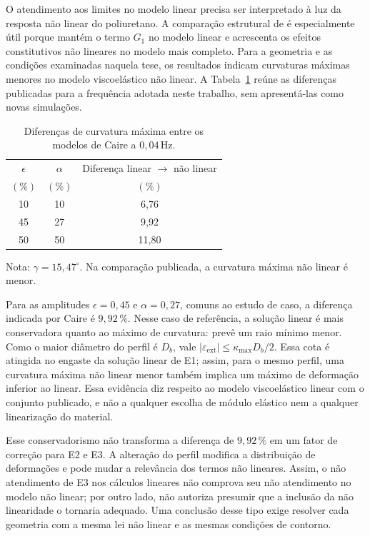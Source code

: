 \documentclass[arial,centeredequations,english,brazilian,oneside,section=TITLE]{ifes8}
\begin{document}
O atendimento aos limites no modelo linear precisa ser interpretado à
luz da resposta não linear do poliuretano. A comparação estrutural de
 é especialmente útil porque mantém o termo
$G_1$ no modelo linear e acrescenta os efeitos constitutivos não lineares
no modelo mais completo. Para a geometria e as condições examinadas
naquela tese, os resultados indicam curvaturas máximas menores no modelo
viscoelástico não linear. A
Tabela~\ref{tab:caire-linear-naolinear} reúne as diferenças publicadas
para a frequência adotada neste trabalho, sem apresentá-las como novas
simulações.

\begin{table}[!htbp]
  \centering
  \caption{Diferenças de curvatura máxima entre os modelos de Caire a $0{,}04\,\mathrm{Hz}$.}
  \label{tab:caire-linear-naolinear}
  \begin{tabular}{ccc}
    \hline
    $\epsilon$ & $\alpha$ & Diferença linear $\rightarrow$ não linear\\
    $(\%)$ & $(\%)$ & $(\%)$\\
    \hline
    10 & 10 & 6,76\\
    45 & 27 & 9,92\\
    50 & 50 & 11,80\\
    \hline
  \end{tabular}
  \smallskip
  {\small Nota: $\gamma=15{,}47^\circ$.
  Na comparação publicada, a curvatura máxima não linear é menor.}
\end{table}

Para as amplitudes $\epsilon=0{,}45$ e $\alpha=0{,}27$, comuns ao estudo
de caso, a diferença indicada por Caire é $9{,}92\,\%$. Nesse caso de
referência, a solução linear é mais conservadora quanto ao máximo de
curvatura: prevê um raio mínimo menor. Como o maior diâmetro do perfil
é $D_b$, vale $|\varepsilon_{\mathrm{ext}}|\leq\kappa_{\max}D_b/2$.
Essa cota é atingida no engaste da solução linear de E1; assim, para
o mesmo perfil, uma curvatura máxima não linear menor também implica
um máximo de deformação inferior ao linear.
Essa evidência diz respeito ao modelo
viscoelástico linear com o conjunto publicado, e não a qualquer escolha
de módulo elástico nem a qualquer linearização do material.

Esse conservadorismo não transforma a diferença de $9{,}92\,\%$ em um
fator de correção para E2 e E3. A alteração do perfil modifica a
distribuição de deformações e pode mudar a relevância dos termos não
lineares. Assim, o não atendimento de E3 nos cálculos lineares não
comprova seu não atendimento no modelo não linear; por outro lado, não
autoriza presumir que a inclusão da não linearidade o tornaria adequado.
Uma conclusão desse tipo exige resolver cada geometria com a mesma lei
não linear e as mesmas condições de contorno.
\end{document}
